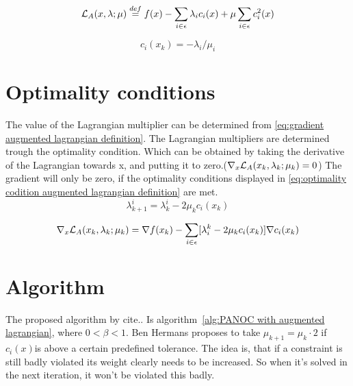 	\begin{equation}
		\mathcal{L}_A(x,\lambda;\mu) \overset{def}{=} f(x) - \sum_{i \in \epsilon}\lambda_ic_i(x) + \mu \sum_{i \in \epsilon}c_i^2(x)
		\label{eq:augmented lagrangian definition}
	\end{equation}
			
	\begin{equation}
		c_i(x_k) = -\lambda_i/\mu_i
		\label{eq:perturbed feasibility conditions}
	\end{equation}
	

\section{Optimality conditions}
	The value of the Lagrangian multiplier can be determined from \eqref{eq:gradient augmented lagrangian definition}. The Lagrangian multipliers are determined trough the optimality condition. Which can be obtained by taking the derivative of the Lagrangian towards x, and putting it to zero.($\nabla_x \mathcal{L}_A(x_k,\lambda_k;\mu_k) = 0$) The gradient will only be zero, if the optimality conditions displayed in \eqref{eq:optimality codition augmented lagrangian definition} are met.
	\begin{equation}
		\lambda_{k+1}^{i} = \lambda_{k}^{i} - 2\mu_k c_i(x_k)
		\label{eq:optimality codition augmented lagrangian definition}
	\end{equation}

	\begin{equation}
		\nabla_x \mathcal{L}_A(x_k,\lambda_k;\mu_k) = \nabla f(x_k) - \sum_{i \in \epsilon} [\lambda_i^k - 2\mu_k c_i(x_k)] \nabla c_i(x_k)
		\label{eq:gradient augmented lagrangian definition}
	\end{equation}	
	
	
	
\section{Algorithm}
	The proposed algorithm by cite.. Is algorithm~\ref{alg:PANOC with augmented lagrangian}, where $0<\beta<1$. Ben Hermans proposes to take $\mu_{k+1}=\mu_k \cdot 2$ if $c_i(x)$is above a certain predefined tolerance. The idea is, that if a constraint is still badly violated its weight clearly needs to be increased. So when it's solved in the next iteration, it won't be violated this badly.
	
